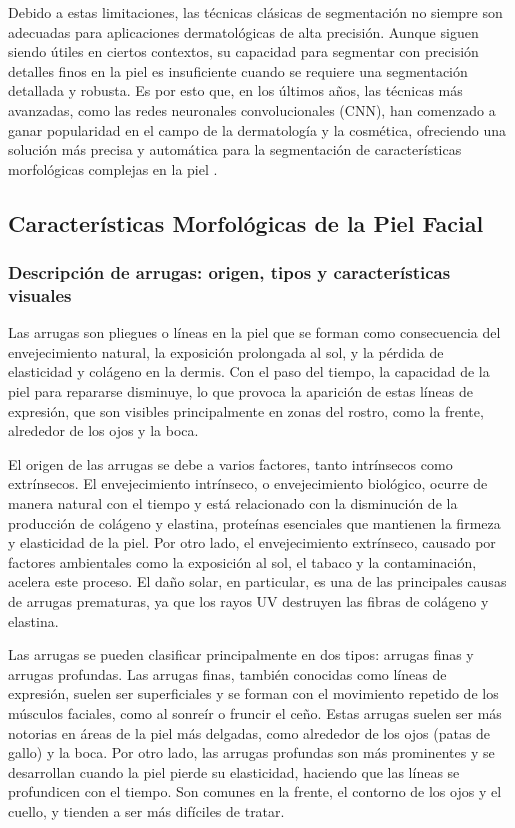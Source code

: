 Debido a estas limitaciones, las técnicas clásicas de segmentación no siempre son adecuadas para aplicaciones dermatológicas de alta precisión. Aunque siguen siendo útiles en ciertos contextos, su capacidad para segmentar con precisión detalles finos en la piel es insuficiente cuando se requiere una segmentación detallada y robusta. Es por esto que, en los últimos años, las técnicas más avanzadas, como las redes neuronales convolucionales (CNN), han comenzado a ganar popularidad en el campo de la dermatología y la cosmética, ofreciendo una solución más precisa y automática para la segmentación de características morfológicas complejas en la piel \cite{yoo2020}.

\subsection{Características Morfológicas de la Piel Facial}

\subsubsection{Descripción de arrugas: origen, tipos y características visuales}
Las arrugas son pliegues o líneas en la piel que se forman como consecuencia del envejecimiento natural, la exposición prolongada al sol, y la pérdida de elasticidad y colágeno en la dermis. Con el paso del tiempo, la capacidad de la piel para repararse disminuye, lo que provoca la aparición de estas líneas de expresión, que son visibles principalmente en zonas del rostro, como la frente, alrededor de los ojos y la boca. 

El origen de las arrugas se debe a varios factores, tanto intrínsecos como extrínsecos. El envejecimiento intrínseco, o envejecimiento biológico, ocurre de manera natural con el tiempo y está relacionado con la disminución de la producción de colágeno y elastina, proteínas esenciales que mantienen la firmeza y elasticidad de la piel. Por otro lado, el envejecimiento extrínseco, causado por factores ambientales como la exposición al sol, el tabaco y la contaminación, acelera este proceso. El daño solar, en particular, es una de las principales causas de arrugas prematuras, ya que los rayos UV destruyen las fibras de colágeno y elastina.

Las arrugas se pueden clasificar principalmente en dos tipos: arrugas finas y arrugas profundas. Las arrugas finas, también conocidas como líneas de expresión, suelen ser superficiales y se forman con el movimiento repetido de los músculos faciales, como al sonreír o fruncir el ceño. Estas arrugas suelen ser más notorias en áreas de la piel más delgadas, como alrededor de los ojos (patas de gallo) y la boca. Por otro lado, las arrugas profundas son más prominentes y se desarrollan cuando la piel pierde su elasticidad, haciendo que las líneas se profundicen con el tiempo. Son comunes en la frente, el contorno de los ojos y el cuello, y tienden a ser más difíciles de tratar.

